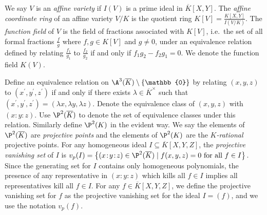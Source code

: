 \documentclass[11pt,letterpaper]{article}
\theoremstyle{definition}
\newcommand{\6}{\mathbf}
\newcommand{\7}{\mathcal}
\newcommand{\zero}{\mathbb{0}}
\begin{document}
We say $V$ is an \textit{affine variety} if $I(V)$ is a prime ideal in $\overline{K}[X,Y]$. The \textit{affine coordinate ring} of an affine variety $V/K$ is the quotient ring $K[V] = \frac{K[X,Y]}{I(V/K)}$. The \textit{function field} of $V$ is the field of fractions associated with $K[V]$, i.e.\ the set of all formal fractions $\frac{f}{g}$ where $f, g \in K[V]$ and $g \neq 0$, under an equivalence relation defined by relating $\frac{f_1}{g_1}$ to $\frac{f_2}{g_2}$ if and only if $f_1 g_2 - f_2 g_1 = 0$. We denote the function field $K(V)$.

Define an equivalence relation on $\A^3(\overline{K}) \setminus \left\{\zero\right\}$ by relating $(x,y,z)$ to $(x^\prime, y^\prime, z^\prime)$ if and only if there exists $\lambda \in \overline{K}^\times$ such that $(x^\prime, y^\prime, z^\prime) = (\lambda x, \lambda y, \lambda z)$. Denote the equivalence class of $(x,y,z)$ with $(x\!:\!y\!:\!z)$. Use $\P^2(\overline{K})$ to denote the set of equivalence classes under this relation. Similarly define $\P^2(K)$ in the evident way. We say the elements of $\P^2(\overline{K})$ are \textit{projective points} and the elements of $\P^2(K)$ are the \textit{$K$-rational} projective points. For any homogeneous ideal $I \subseteq \overline{K}[X,Y,Z]$, the \textit{projective vanishing set} of $I$ is $v_p(I) = \left\{(x\!:\!y\!:\!z) \in \P^2(\overline{K}) \mid f(x,y,z)=0\text{ for all }f \in I\right\}$. Since the generating set for $I$ contains only homogeneous polynomials, the presence of any representative in $(x\!:\!y\!:\!z)$ which kills all $f \in I$ implies all representatives kill all $f \in I$. For any $f \in \overline{K}[X,Y,Z]$, we define the projective vanishing set for $f$ as the projective vanishing set for the ideal $I=(f)$, and we use the notation $v_p(f)$.



\end{document}

